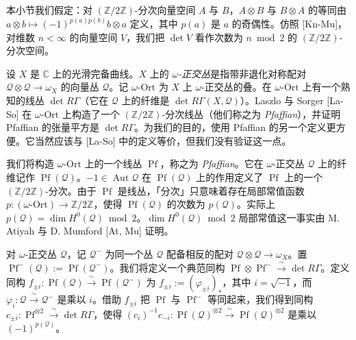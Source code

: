 
本小节我们假定：对 $(\mathbb{Z}/2\mathbb{Z})$-分次向量空间 $A$ 与 $B$，$A\otimes B$ 与 $B\otimes A$ 的等同由 $a\otimes b\mapsto(-1)^{p(a)p(b)}b\otimes a$ 定义，其中 $p(a)$ 是 $a$ 的奇偶性。仿照 [Kn-Mu]，对维数 $n<\infty$ 的向量空间 $V$，我们把 $\det V$ 看作次数为 $n\bmod 2$ 的 $(\mathbb{Z}/2\mathbb{Z})$-分次空间。

 设 $X$ 是 $\mathbb{C}$ 上的光滑完备曲线。$X$ 上的 \emph{$\omega$-正交丛}是指带非退化对称配对 $\mathcal{Q}\otimes\mathcal{Q}\to\omega_{X}$ 的向量丛 $\mathcal{Q}$。记 $\omega\text{-Ort}$ 为 $X$ 上 $\omega$-正交丛的叠。在 $\omega\text{-Ort}$ 上有一个熟知的线丛 $\det R\Gamma$（它在 $\mathcal{Q}$ 上的纤维是 $\det R\Gamma(X,\mathcal{Q})$）。Laszlo 与 Sorger [La-So] 在 $\omega\text{-Ort}$ 上构造了一个 $(\mathbb{Z}/2\mathbb{Z})$-分次线丛（他们称之为 \emph{Pfaffian}），并证明 Pfaffian 的张量平方是 $\det R\Gamma$。为我们的目的，使用 Pfaffian 的另一个定义更方便。它当然应该与 [La-So] 中的定义等价，但我们没有验证这一点。

我们将构造 $\omega\text{-Ort}$ 上的一个线丛 $\operatorname{Pf}$，称之为 \emph{Pfaffian}。它在 $\omega$-正交丛 $\mathcal{Q}$ 上的纤维记作 $\operatorname{Pf}(\mathcal{Q})$。$-1\in\operatorname{Aut}\mathcal{Q}$ 在 $\operatorname{Pf}(\mathcal{Q})$ 上的作用定义了 $\operatorname{Pf}$ 上的一个 $(\mathbb{Z}/2\mathbb{Z})$-分次。由于 $\operatorname{Pf}$ 是线丛，「分次」只意味着存在局部常值函数 $p:(\omega\text{-Ort})\to\mathbb{Z}/2\mathbb{Z}$，使得 $\operatorname{Pf}(\mathcal{Q})$ 的次数为 $p(\mathcal{Q})$。实际上 $p(\mathcal{Q})=\dim H^{0}(\mathcal{Q})\bmod 2$。$\dim H^{0}(\mathcal{Q})\bmod 2$ 局部常值这一事实由 M. Atiyah 与 D. Mumford [At, Mu] 证明。

对 $\omega$-正交丛 $\mathcal{Q}$，记 $\mathcal{Q}^{-}$ 为同一个丛 $\mathcal{Q}$ 配备相反的配对 $\mathcal{Q}\otimes\mathcal{Q}\to\omega_{X}$。置 $\operatorname{Pf}^{-}(\mathcal{Q}):=\operatorname{Pf}(\mathcal{Q}^{-})$。我们将定义一个典范同构 $\operatorname{Pf}\otimes\operatorname{Pf}^{-}\xrightarrow{\ \sim\ }\det R\Gamma$。定义同构 $f_{\pm i}:\operatorname{Pf}(\mathcal{Q})\xrightarrow{\ \sim\ }\operatorname{Pf}(\mathcal{Q}^{-})$ 为 $f_{\pm i}:=(\varphi_{\pm i})_{*}$，其中 $i=\sqrt{-1}$，而 $\varphi_{i}:\mathcal{Q}\xrightarrow{\ \sim\ }\mathcal{Q}^{-}$ 是乘以 $i$。借助 $f_{\pm i}$ 把 $\operatorname{Pf}$ 与 $\operatorname{Pf}^{-}$ 等同起来，我们得到同构 $c_{\pm i}:\operatorname{Pf}^{\otimes 2}\xrightarrow{\ \sim\ }\det R\Gamma$，使得 $(c_{i})^{-1}c_{-i}:\operatorname{Pf}(\mathcal{Q})^{\otimes 2}\xrightarrow{\ \sim\ }\operatorname{Pf}(\mathcal{Q})^{\otimes 2}$ 是乘以 $(-1)^{p(\mathcal{Q})}$。

